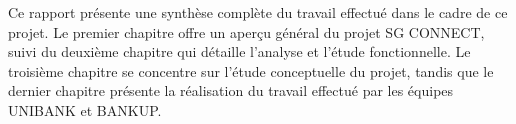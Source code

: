 Ce rapport présente une synthèse complète du travail effectué dans le cadre de ce projet. Le premier chapitre offre un aperçu général du projet SG CONNECT, suivi du deuxième chapitre qui détaille l'analyse et l'étude fonctionnelle. Le troisième chapitre se concentre sur l'étude conceptuelle du projet, tandis que le dernier chapitre présente la réalisation du travail effectué par les équipes UNIBANK et BANKUP.\\